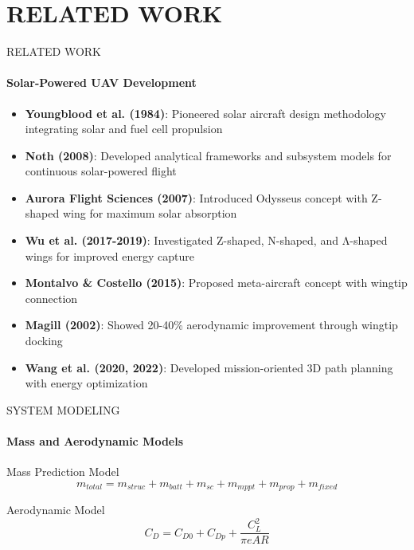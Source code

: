 \documentclass{beamer}
\begin{document}
	\section{RELATED WORK}
\begin{frame}{RELATED WORK}
    \framesubtitle{Solar-Powered UAV Development}
    \begin{itemize}
        \item \textbf{Youngblood et al. (1984)}: Pioneered solar aircraft design methodology integrating solar and fuel cell propulsion
        \item \textbf{Noth (2008)}: Developed analytical frameworks and subsystem models for continuous solar-powered flight
        \item \textbf{Aurora Flight Sciences (2007)}: Introduced Odysseus concept with Z-shaped wing for maximum solar absorption
        \item \textbf{Wu et al. (2017-2019)}: Investigated Z-shaped, N-shaped, and Λ-shaped wings for improved energy capture
        \item \textbf{Montalvo \& Costello (2015)}: Proposed meta-aircraft concept with wingtip connection
        \item \textbf{Magill (2002)}: Showed 20-40\% aerodynamic improvement through wingtip docking
        \item \textbf{Wang et al. (2020, 2022)}: Developed mission-oriented 3D path planning with energy optimization
    \end{itemize}
\end{frame}

\begin{frame}{SYSTEM MODELING}
    \framesubtitle{Mass and Aerodynamic Models}
    
    \begin{block}{Mass Prediction Model}
    \begin{equation*}
        m_{total} = m_{struc} + m_{batt} + m_{sc} + m_{mppt} + m_{prop} + m_{fixed}
    \end{equation*}
    \end{block}
    
    \begin{block}{Aerodynamic Model}
    \begin{equation*}
        C_D = C_{D0} + C_{Dp} + \frac{C_L^2}{\pi eAR}
    \end{equation*}
    \end{block}
\end{frame}
\end{document}
